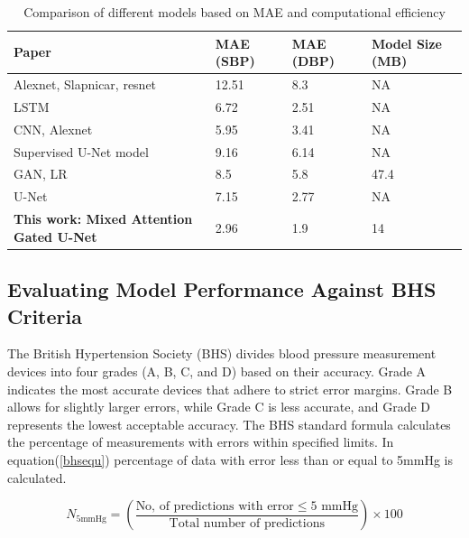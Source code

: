 \documentclass[journal,twoside,web]{ieeecolor}
\begin{document}
\begin{table}[h!]
\caption{Comparison of different models based on MAE and computational efficiency}
\centering
\renewcommand{\arraystretch}{1.2}
\setlength{\tabcolsep}{4pt}
\begin{tabular}{| p{2.5cm} | p{1.1cm} | p{1.1cm} | p{1.5cm} |}
\hline
\textbf{Paper} & \textbf{MAE (SBP)} & \textbf{MAE (DBP)} & \textbf{Model Size (MB)} \\ 
\hline
[1] Alexnet, Slapnicar, resnet & 12.51 & 8.3 & NA \\ 
\hline
[2] LSTM & 6.72 & 2.51 & NA \\ 
\hline
[3] CNN, Alexnet & 5.95 & 3.41 & NA \\ 
\hline
[10] Supervised U-Net model & 9.16 & 6.14 & NA\\ 
\hline
[11] GAN, LR & 8.5 & 5.8 & 47.4 \\ 
\hline
[12] U-Net & 7.15 & 2.77 & NA\\ 
\hline
\textbf{This work: Mixed Attention Gated U-Net} & 2.96 & 1.9 & 14 \\ 
\hline
\end{tabular}
\label{tab:comparison}
\end{table}
\subsection{Evaluating Model Performance Against BHS Criteria}
The British Hypertension Society (BHS) divides blood pressure measurement devices into four grades (A, B, C, and D) based on their accuracy. Grade A indicates the most accurate devices that adhere to strict error margins. Grade B allows for slightly larger errors, while Grade C is less accurate, and Grade D represents the lowest acceptable accuracy.
The BHS standard formula calculates the percentage of measurements with errors within specified limits. In equation(\ref{bhsequ}) percentage of data with error less than or equal to 5mmHg is calculated.

\begin{equation}
N_{5 \text{mmHg}} = \left( \frac{\text{No, of predictions with error} \leq 5 \text{ mmHg}}{\text{Total number of predictions}} \right) \times 100
\label{bhsequ}
\end{equation}
\end{document}

